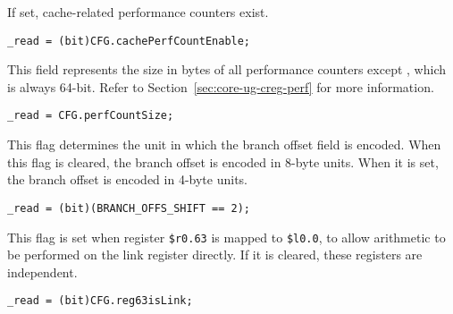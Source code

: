 If set, cache-related performance counters exist.

\reset{*}
\implementation{}
\begin{lstlisting}
_read = (bit)CFG.cachePerfCountEnable;
\end{lstlisting}

This field represents the size in bytes of all performance counters except
, which is always 64-bit. Refer to Section~\ref{sec:core-ug-creg-perf}
for more information.

\reset{***}
\implementation{}
\begin{lstlisting}
_read = CFG.perfCountSize;
\end{lstlisting}

This flag determines the unit in which the branch offset field is encoded. When
this flag is cleared, the branch offset is encoded in 8-byte units. When it is
set, the branch offset is encoded in 4-byte units.

\reset{*}
\implementation{}
\begin{lstlisting}
_read = (bit)(BRANCH_OFFS_SHIFT == 2);
\end{lstlisting}

This flag is set when register \texttt{\$r0.63} is mapped to \texttt{\$l0.0}, to
allow arithmetic to be performed on the link register directly. If it is
cleared, these registers are independent.

\reset{*}
\implementation{}
\begin{lstlisting}
_read = (bit)CFG.reg63isLink;
\end{lstlisting}

